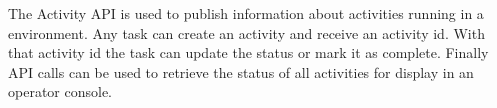 The Activity API is used to publish information about activities running in
a \Rapture environment. Any task can create an activity and receive an activity id.
With that activity id the task can update the status or mark it as complete. Finally API calls
can be used to retrieve the status of all activities for display in an operator console.
